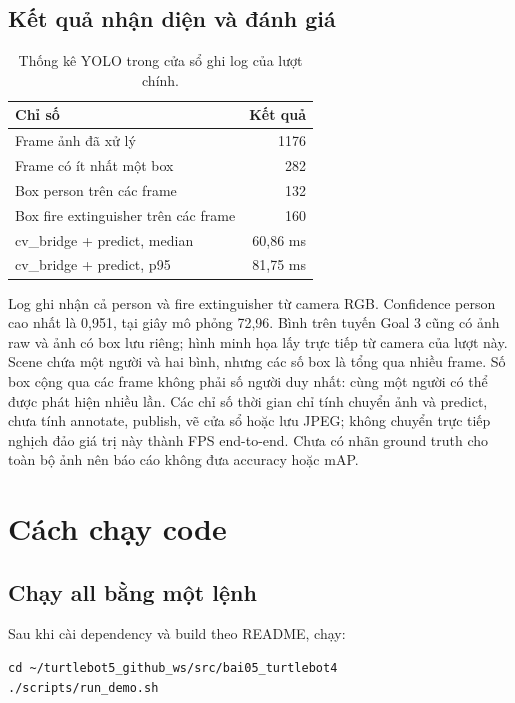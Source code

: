 \documentclass[a4paper,11pt]{article}
\begin{document}
\subsection{Kết quả nhận diện và đánh giá}
\begin{table}[H]\centering\small
\begin{tabular}{@{}lr@{}}\toprule
Chỉ số & Kết quả\\\midrule
Frame ảnh đã xử lý & 1176\\
Frame có ít nhất một box & 282\\
Box person trên các frame & 132\\
Box fire extinguisher trên các frame & 160\\
cv\_bridge + predict, median & 60,86 ms\\
cv\_bridge + predict, p95 & 81,75 ms\\\bottomrule
\end{tabular}
\caption{Thống kê YOLO trong cửa sổ ghi log của lượt chính.}
\end{table}

Log ghi nhận cả person và fire extinguisher từ camera RGB. Confidence person cao nhất là 0,951, tại giây mô phỏng 72,96. Bình trên tuyến Goal 3 cũng có ảnh raw và ảnh có box lưu riêng; hình minh họa lấy trực tiếp từ camera của lượt này. Scene chứa một người và hai bình, nhưng các số box là tổng qua nhiều frame.
Số box cộng qua các frame không phải số người duy nhất: cùng một người có thể
được phát hiện nhiều lần. Các chỉ số thời gian chỉ tính chuyển ảnh và predict,
chưa tính annotate, publish, vẽ cửa sổ hoặc lưu JPEG; không chuyển trực tiếp
nghịch đảo giá trị này thành FPS end-to-end. Chưa có nhãn ground truth cho toàn
bộ ảnh nên báo cáo không đưa accuracy hoặc mAP.

\section{Cách chạy code}
\subsection{Chạy all bằng một lệnh}

Sau khi cài dependency và build theo README, chạy:
\begin{Verbatim}
cd ~/turtlebot5_github_ws/src/bai05_turtlebot4
./scripts/run_demo.sh
\end{Verbatim}
\end{document}
